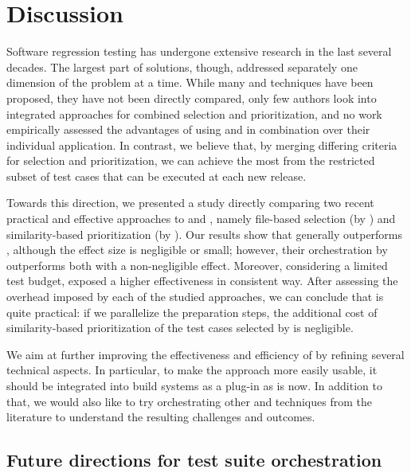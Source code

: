 \section{Discussion}\label{sec:orch_discussion}

Software regression testing has undergone extensive research in the last several decades.
The largest part of solutions, though, addressed separately one dimension of the problem at a time.
While many \tcs and \tcp techniques have been proposed, they have not been directly compared, only
few authors look into integrated approaches for combined selection and prioritization, and no work empirically assessed the advantages of using \tcs and \tcp in combination over their individual application.
In contrast, we believe that, by merging differing criteria for selection and prioritization, we can achieve the most from the restricted subset of test cases that can be executed at each new release.

Towards this direction, we presented a study directly comparing 
two recent practical and effective approaches to \tcs and \tcp, namely 
file-based selection (by \ek) and similarity-based prioritization (by \fs).
Our results show that \ek generally outperforms \fs, although the effect size is negligible or small;
however, their orchestration by \fz outperforms both with a non-negligible effect. 
Moreover, considering a limited test budget, \fz exposed a higher effectiveness in consistent way. 
After assessing the overhead imposed by each of the studied approaches, we can conclude that \fz is quite practical: if we parallelize the preparation steps, the additional cost of similarity-based prioritization of the test cases selected by \ek is negligible.  

We aim at further improving the effectiveness and efficiency of \fz by refining several technical aspects. 
In particular, to make the approach more easily usable, it should be integrated into build systems as a plug-in as \ek is now.
In addition to that, we would also like to try orchestrating other \tcs and \tcp techniques from the literature to understand the resulting challenges and outcomes.


\subsection{Future directions for test suite orchestration}

